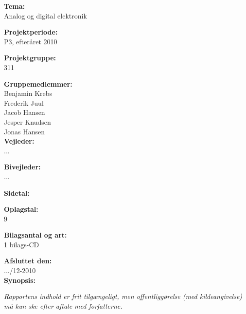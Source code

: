 \begin{multicols}{2}

\small{
\textbf{Tema:\\}
Analog og digital elektronik

\textbf{Projektperiode:\\}
P3, efteråret 2010

\textbf{Projektgruppe:\\}
311

\textbf{Gruppemedlemmer:\\}
Benjamin Krebs\\
Frederik Juul\\
Jacob Hansen\\
Jesper Knudsen\\
Jonas Hansen\\

\textbf{Vejleder:\\}
...

\textbf{Bivejleder:\\}
...

\textbf{Sidetal:\\}
\pageref{LastPage}

\textbf{Oplagstal:\\}
9

\textbf{Bilagsantal og art:\\}
1 bilags-CD

\textbf{Afsluttet den:\\}
.../12-2010
\\
\textbf{Synopsis:}
}

\newline
\end{multicols}
\textit{\scriptsize{Rapportens indhold er frit tilgængeligt, men offentliggørelse (med kildeangivelse) må kun ske efter aftale med forfatterne.}}